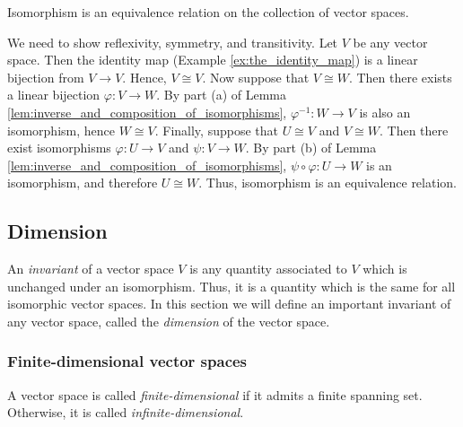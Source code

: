 \documentclass[12pt,letterpaper,reqno]{article}
\numberwithin{equation}{section}
\begin{document}
\begin{thm}
Isomorphism is an equivalence relation on the collection of vector spaces.
\end{thm}

\begin{pf}
We need to show reflexivity, symmetry, and transitivity. Let $V$ be any vector space. Then the identity map (Example \ref{ex:the_identity_map}) is a linear bijection from $V \to V$. Hence, $V \cong V$. Now suppose that $V \cong W$. Then there exists a linear bijection $\varphi:V \to W$. By part (a) of Lemma \ref{lem:inverse_and_composition_of_isomorphisms}, $\varphi^{-1}:W\to V$ is also an isomorphism, hence $W \cong V$. Finally, suppose that $U \cong V$ and $V \cong W$. Then there exist isomorphisms $\varphi:U \to V$ and $\psi:V \to W$. By part (b) of Lemma \ref{lem:inverse_and_composition_of_isomorphisms}, $\psi \circ \varphi:U \to W$ is an isomorphism, and therefore $U \cong W$. Thus, isomorphism is an equivalence relation. 	
\end{pf}


\subsection{Dimension}
An \emph{invariant} of a vector space $V$ is any quantity associated to $V$ which is unchanged under an isomorphism. Thus, it is a quantity which is the same for all isomorphic vector spaces. In this section we will define an important invariant of any vector space, called the \emph{dimension} of the vector space. 
\subsubsection{Finite-dimensional vector spaces}
\begin{defn}
	A vector space is called \emph{finite-dimensional} if it admits a finite spanning set. Otherwise, it is called \emph{infinite-dimensional}.
\end{defn}
\end{document}
